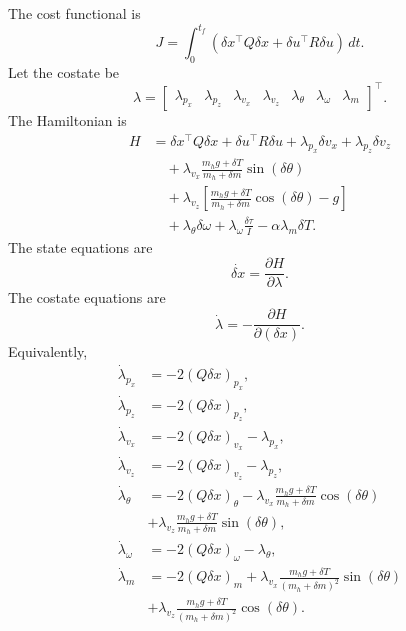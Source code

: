 The cost functional is
\begin{equation}
    J
    =
    \int_0^{t_f}
    \left(
        \delta x^{\top}Q\delta x
        +
        \delta u^{\top}R\delta u
    \right)\,dt.
\end{equation}
Let the costate be
\begin{equation}
    \lambda
    =
    \begin{bmatrix}
        \lambda_{p_x} &
        \lambda_{p_z} &
        \lambda_{v_x} &
        \lambda_{v_z} &
        \lambda_{\theta} &
        \lambda_{\omega} &
        \lambda_m
    \end{bmatrix}^{\top}.
\end{equation}
The Hamiltonian is
\begin{align}
    H
    &=
    \delta x^{\top}Q\delta x
    +
    \delta u^{\top}R\delta u
    +
    \lambda_{p_x}\delta v_x
    +
    \lambda_{p_z}\delta v_z \nonumber \\
    &\quad
    +
    \lambda_{v_x}
    \frac{m_h g+\delta T}{m_h+\delta m}
    \sin(\delta\theta) \nonumber \\
    &\quad
    +
    \lambda_{v_z}
    \left[
        \frac{m_h g+\delta T}{m_h+\delta m}
        \cos(\delta\theta)
        -
        g
    \right] \nonumber \\
    &\quad
    +
    \lambda_{\theta}\delta\omega
    +
    \lambda_{\omega}\frac{\delta\tau}{I}
    -
    \alpha\lambda_m\delta T .
\end{align}
The state equations are
\begin{equation}
    \dot{\delta x} = \frac{\partial H}{\partial \lambda}.
\end{equation}
The costate equations are
\begin{equation}
    \dot\lambda = -\frac{\partial H}{\partial (\delta x)}.
\end{equation}
Equivalently,
\begin{align}
    \dot\lambda_{p_x}
    &=
    -2(Q\delta x)_{p_x}, \\
    \dot\lambda_{p_z}
    &=
    -2(Q\delta x)_{p_z}, \\
    \dot\lambda_{v_x}
    &=
    -2(Q\delta x)_{v_x}
    -
    \lambda_{p_x}, \\
    \dot\lambda_{v_z}
    &=
    -2(Q\delta x)_{v_z}
    -
    \lambda_{p_z}, \\
    \dot\lambda_{\theta}
    &=
    -2(Q\delta x)_{\theta}
    -
    \lambda_{v_x}
    \frac{m_h g+\delta T}{m_h+\delta m}
    \cos(\delta\theta)\\
    &+
    \lambda_{v_z}
    \frac{m_h g+\delta T}{m_h+\delta m}
    \sin(\delta\theta), \\ \nonumber
    \dot\lambda_{\omega}
    &=
    -2(Q\delta x)_{\omega}
    -
    \lambda_{\theta}, \\
    \dot\lambda_m
    &=
    -2(Q\delta x)_m
    +
    \lambda_{v_x}
    \frac{m_h g+\delta T}{(m_h+\delta m)^2}
    \sin(\delta\theta) \\
    &+
    \lambda_{v_z}
    \frac{m_h g+\delta T}{(m_h+\delta m)^2}
    \cos(\delta\theta). \nonumber
\end{align}

